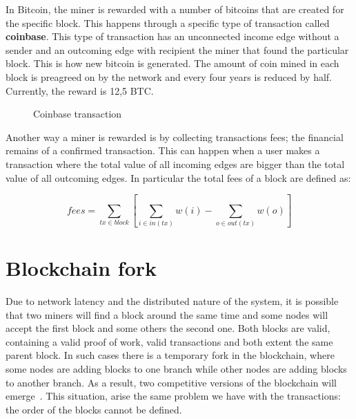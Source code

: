 In Bitcoin, the miner is rewarded with a number of bitcoins that are created for the specific block. This happens through a specific type of transaction called \textbf{coinbase}. This type of transaction has an unconnected income edge without a sender and an outcoming edge with recipient the miner that found the particular block. This is how new bitcoin is generated. The amount of coin mined in each block is preagreed on by the network and every four years is reduced by half. Currently, the reward is 12,5 BTC.

\begin{figure}[!ht]
  \centering
  \caption{Coinbase transaction}
  \label{fig:mining:coinbase}
\end{figure}

Another way a miner is rewarded is by collecting transactions fees;  the financial remains of a confirmed transaction. This can happen when a user makes a transaction where the total value of all incoming edges are bigger than the total value of all outcoming edges. In particular the total fees of a block are defined as:

\begin{equation*}
  fees = \sum_{tx \in block} [ \sum_{i \in in(tx) }w(i) -  \sum_{o \in out(tx) }w(o)]
\end{equation*}

\section{Blockchain fork}\label{blockchain:fork}

Due to network latency and the distributed nature of the system, it is possible that two miners will find a block around the same time and some nodes will accept the first block and some others the second one. Both blocks are valid, containing a valid proof of work, valid transactions and both extent the same parent block. In such cases there is a temporary fork in the blockchain, where some nodes are adding blocks to one branch while other nodes are adding blocks to another branch. As a result, two competitive versions of the blockchain will emerge~\cite{antonopoulos2014mastering}. This situation, arise the same problem we have with the transactions: the order of the blocks cannot be defined.

